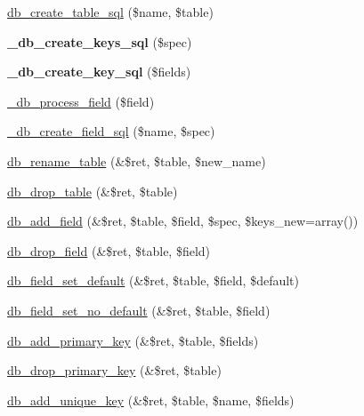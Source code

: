 \begin{CompactItemize}
\item 
\hyperlink{group__schemaapi_gd567c41b41c4d48ed50af9b878c8ecaf}{db\_\-create\_\-table\_\-sql} (\$name, \$table)
\item 
\hypertarget{group__schemaapi_ga4be538758cb8279d3aeed18e1b25c2d}{
\textbf{\_\-db\_\-create\_\-keys\_\-sql} (\$spec)}
\label{group__schemaapi_ga4be538758cb8279d3aeed18e1b25c2d}

\item 
\hypertarget{group__schemaapi_gaaad5b3ac359e52b5c8e1058a3748615}{
\textbf{\_\-db\_\-create\_\-key\_\-sql} (\$fields)}
\label{group__schemaapi_gaaad5b3ac359e52b5c8e1058a3748615}

\item 
\hyperlink{group__schemaapi_g4c5486f85f0d1feeb4efba32f01926fb}{\_\-db\_\-process\_\-field} (\$field)
\item 
\hyperlink{group__schemaapi_ge5ec976573ad46239192dcd139d07f10}{\_\-db\_\-create\_\-field\_\-sql} (\$name, \$spec)
\item 
\hyperlink{group__schemaapi_gbb4d2d8b00f915ba7e8c0a9d985d597d}{db\_\-rename\_\-table} (\&\$ret, \$table, \$new\_\-name)
\item 
\hyperlink{group__schemaapi_g1da2016702d7da653316aa34fcd86bd9}{db\_\-drop\_\-table} (\&\$ret, \$table)
\item 
\hyperlink{group__schemaapi_gdffaa3314b3f50ffd6ba4da381ec78fb}{db\_\-add\_\-field} (\&\$ret, \$table, \$field, \$spec, \$keys\_\-new=array())
\item 
\hyperlink{group__schemaapi_ge2013b878edbcfe21ca123e73af4684a}{db\_\-drop\_\-field} (\&\$ret, \$table, \$field)
\item 
\hyperlink{group__schemaapi_gf5a1ae05cf11189bc6e0f6a8ed2b7701}{db\_\-field\_\-set\_\-default} (\&\$ret, \$table, \$field, \$default)
\item 
\hyperlink{group__schemaapi_ga01758e1338d2b1ce59da26c08c6448a}{db\_\-field\_\-set\_\-no\_\-default} (\&\$ret, \$table, \$field)
\item 
\hyperlink{group__schemaapi_g95e6db824dbcdd4f9f486e657137d482}{db\_\-add\_\-primary\_\-key} (\&\$ret, \$table, \$fields)
\item 
\hyperlink{group__schemaapi_gb8ee0e7e9ca04e60ec8b0464a247425d}{db\_\-drop\_\-primary\_\-key} (\&\$ret, \$table)
\item 
\hyperlink{group__schemaapi_g407af986b5e78e1ef11242d5be8adfc4}{db\_\-add\_\-unique\_\-key} (\&\$ret, \$table, \$name, \$fields)
\item 

\end{CompactItemize}
